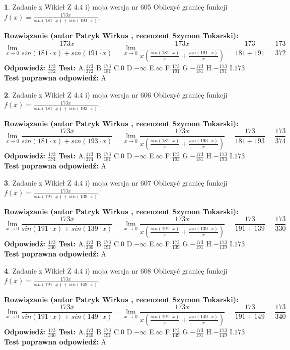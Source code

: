 \documentclass[12pt, a4paper]{article}
\theoremstyle{definition} %
\newtheorem{zad}{}
\newcommand{\zadStart}[1]{\begin{zad}#1\newline}
\newcommand{\zadStop}{\end{zad}}
\newcommand{\rozwStart}[2]{\noindent \textbf{Rozwiązanie (autor #1 , recenzent #2): }\newline}
\newcommand{\rozwStop}{\newline}
\newcommand{\odpStart}{\noindent \textbf{Odpowiedź:}\newline}
\newcommand{\odpStop}{\newline}
\newcommand{\testStart}{\noindent \textbf{Test:}\newline}
\newcommand{\testStop}{\newline}
\newcommand{\kluczStart}{\noindent \textbf{Test poprawna odpowiedź:}\newline}
\newcommand{\kluczStop}{\newline}
\begin{document}
\zadStart{Zadanie z Wikieł Z 4.4 i) moja wersja nr 605}
Obliczyć granicę funkcji $f(x)=\frac{173x}{sin(181\cdot x) +sin(191\cdot x)}$.
\zadStop
\rozwStart{Patryk Wirkus}{Szymon Tokarski}
$$\lim\limits_{x\to 0}\frac{173x}{sin(181\cdot x) +sin(191\cdot x)}=\lim\limits_{x\to 0}\frac{173x}{x(\frac{sin(181\cdot x)}{x}+\frac{sin(191\cdot x)}{x})}=\frac{173}{181+191} = \frac{173}{372}$$
\rozwStop
\odpStart
$\frac{173}{372}$
\odpStop
\testStart
A.$\frac{173}{372}$
B.$\frac{173}{181}$
C.$0$
D.$-\infty$
E.$\infty$
F.$\frac{173}{191}$
G.$-\frac{173}{181}$
H.$-\frac{173}{191}$
I.$173$
\testStop
\kluczStart
A
\kluczStop



\zadStart{Zadanie z Wikieł Z 4.4 i) moja wersja nr 606}
Obliczyć granicę funkcji $f(x)=\frac{173x}{sin(181\cdot x) +sin(193\cdot x)}$.
\zadStop
\rozwStart{Patryk Wirkus}{Szymon Tokarski}
$$\lim\limits_{x\to 0}\frac{173x}{sin(181\cdot x) +sin(193\cdot x)}=\lim\limits_{x\to 0}\frac{173x}{x(\frac{sin(181\cdot x)}{x}+\frac{sin(193\cdot x)}{x})}=\frac{173}{181+193} = \frac{173}{374}$$
\rozwStop
\odpStart
$\frac{173}{374}$
\odpStop
\testStart
A.$\frac{173}{374}$
B.$\frac{173}{181}$
C.$0$
D.$-\infty$
E.$\infty$
F.$\frac{173}{193}$
G.$-\frac{173}{181}$
H.$-\frac{173}{193}$
I.$173$
\testStop
\kluczStart
A
\kluczStop



\zadStart{Zadanie z Wikieł Z 4.4 i) moja wersja nr 607}
Obliczyć granicę funkcji $f(x)=\frac{173x}{sin(191\cdot x) +sin(139\cdot x)}$.
\zadStop
\rozwStart{Patryk Wirkus}{Szymon Tokarski}
$$\lim\limits_{x\to 0}\frac{173x}{sin(191\cdot x) +sin(139\cdot x)}=\lim\limits_{x\to 0}\frac{173x}{x(\frac{sin(191\cdot x)}{x}+\frac{sin(139\cdot x)}{x})}=\frac{173}{191+139} = \frac{173}{330}$$
\rozwStop
\odpStart
$\frac{173}{330}$
\odpStop
\testStart
A.$\frac{173}{330}$
B.$\frac{173}{191}$
C.$0$
D.$-\infty$
E.$\infty$
F.$\frac{173}{139}$
G.$-\frac{173}{191}$
H.$-\frac{173}{139}$
I.$173$
\testStop
\kluczStart
A
\kluczStop



\zadStart{Zadanie z Wikieł Z 4.4 i) moja wersja nr 608}
Obliczyć granicę funkcji $f(x)=\frac{173x}{sin(191\cdot x) +sin(149\cdot x)}$.
\zadStop
\rozwStart{Patryk Wirkus}{Szymon Tokarski}
$$\lim\limits_{x\to 0}\frac{173x}{sin(191\cdot x) +sin(149\cdot x)}=\lim\limits_{x\to 0}\frac{173x}{x(\frac{sin(191\cdot x)}{x}+\frac{sin(149\cdot x)}{x})}=\frac{173}{191+149} = \frac{173}{340}$$
\rozwStop
\odpStart
$\frac{173}{340}$
\odpStop
\testStart
A.$\frac{173}{340}$
B.$\frac{173}{191}$
C.$0$
D.$-\infty$
E.$\infty$
F.$\frac{173}{149}$
G.$-\frac{173}{191}$
H.$-\frac{173}{149}$
I.$173$
\testStop
\kluczStart
A
\kluczStop
\end{document}
